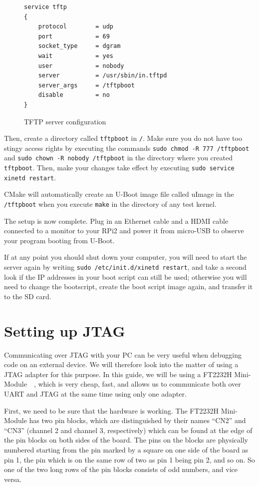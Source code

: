 \documentclass[a4paper,11pt,reqno]{amsart}
\begin{document}
{\begin{figure}[hb]
\begin{center}
\begin{BVerbatim}
service tftp
{
    protocol        = udp
    port            = 69
    socket_type     = dgram
    wait            = yes
    user            = nobody
    server          = /usr/sbin/in.tftpd
    server_args     = /tftpboot
    disable         = no
}
\end{BVerbatim}
\end{center}
\caption{TFTP server configuration}
\label{fig:server}
\end{figure}

Then, create a directory called \texttt{tftpboot} in \texttt{/}. Make sure you do not have too stingy access rights by executing the commands \texttt{sudo chmod -R 777 /tftpboot} and \texttt{sudo chown -R nobody /tftpboot} in the directory where you created \texttt{tftpboot}. Then, make your changes take effect by executing \texttt{sudo service xinetd restart}.

CMake will automatically create an U-Boot image file called uImage in the \texttt{/tftpboot} when you execute \texttt{make} in the directory of any test kernel.

The setup is now complete. Plug in an Ethernet cable and a HDMI cable connected to a monitor to your RPi2 and power it from micro-USB to observe your program booting from U-Boot.

If at any point you should shut down your computer, you will need to start the server again by writing \texttt{sudo /etc/init.d/xinetd restart}, and take a second look if the IP addresses in your boot script can still be used; otherwise you will need to change the bootscript, create the boot script image again, and transfer it to the SD card.

\section{Setting up JTAG}
Communicating over JTAG with your PC can be very useful when debugging code on an external device. We will therefore look into the matter of using a JTAG adapter for this purpose. In this guide, we will be using a FT2232H Mini-Module~\cite{ft2232h}~\cite{ft2232hmm}, which is very cheap, fast, and allows us to communicate both over UART and JTAG at the same time using only one adapter.

First, we need to be sure that the hardware is working. The FT2232H Mini-Module has two pin blocks, which are distinguished by their names ``CN2'' and ``CN3'' (channel 2 and channel 3, respectively) which can be found at the edge of the pin blocks on both sides of the board. The pins on the blocks are physically numbered starting from the pin marked by a square on one side of the board as pin 1, the pin which is on the same row of two as pin 1 being pin 2, and so on. So one of the two long rows of the pin blocks consists of odd numbers, and vice versa.

}
\end{document}
